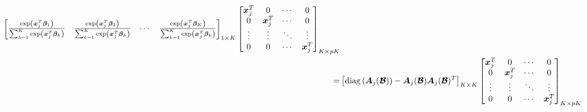 \documentclass[letter]{article}
\begin{document}
$$\begin{aligned}
	\begin{bmatrix}
	\frac{\exp\left(\bm{x}_j^T\bm{\beta}_1\right)}{\sum_{k=1}^K\exp\left(\bm{x}_j^T\bm{\beta}_k\right)} &
	\frac{\exp\left(\bm{x}_j^T\bm{\beta}_2\right)}{\sum_{k=1}^K\exp\left(\bm{x}_j^T\bm{\beta}_k\right)} &
	\cdots &
	\frac{\exp\left(\bm{x}_j^T\bm{\beta}_K\right)}{\sum_{k=1}^K\exp\left(\bm{x}_j^T\bm{\beta}_k\right)}
	\end{bmatrix}_{1\times K}
	\begin{bmatrix}
	\bm{x}_j^T & 0 & \cdots & 0 \\
	0 & \bm{x}_j^T & \cdots & 0 \\
	\vdots & \vdots & \ddots & \vdots \\
	0 & 0 & \cdots & \bm{x}_j^T \\
	\end{bmatrix}_{K\times pK} \\
	=&\left[{\rm diag}\left(\bm{A}_j(\bm{\mathcal{B}})\right)-\bm{A}_j(\bm{\mathcal{B}})\bm{A}_j(\bm{\mathcal{B}})^T\right]_{K\times K}
	\begin{bmatrix}
	\bm{x}_j^T & 0 & \cdots & 0 \\
	0 & \bm{x}_j^T & \cdots & 0 \\
	\vdots & \vdots & \ddots & \vdots \\
	0 & 0 & \cdots & \bm{x}_j^T \\
	\end{bmatrix}_{K\times pK} \\
	\end{aligned}$$
	
\end{document}
